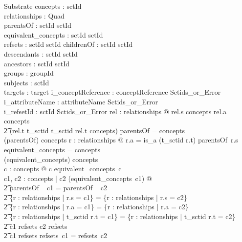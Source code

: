 \documentclass{article}
\begin{document}
\begin{schema}{Substrate}
   concepts : \power sctId \\
   relationships : \power Quad  \\
   parentsOf : sctId \pfun \power sctId \\
   equivalent\_concepts : sctId \pfun \power sctId \\
   refsets : sctId \pfun \power sctId 
\also
   childrenOf : sctId \pfun \power sctId \\
   descendants : sctId \pfun \power sctId \\
   ancestors : sctId \pfun \power sctId \\
\also
   groups : \power groupId \\
   subjects : \power sctId \\
   targets : \power target
\also
   i\_conceptReference : conceptReference \fun Sctids\_or\_Error \\
   i\_attributeName : attributeName \fun Sctids\_or\_Error \\
   i\_refsetId : sctId \fun Sctids\_or\_Error
\where
   \forall rel : relationships @  rel.s \in concepts \land rel.a \in concepts \land \\
\t2 (rel.t \in \ran t\_sctid \implies t\_sctid \inv rel.t \in concepts)
\also
   \dom parentsOf = concepts \\
   \bigcup (\ran parentsOf) \subseteq concepts
\also
   \forall r : relationships @ r.a = is\_a \implies (t\_sctid \inv r.t) \in parentsOf~r.s
\also
   \dom equivalent\_concepts = concepts \\
   \bigcup (\ran equivalent\_concepts) \subseteq concepts \\
  \forall c : concepts @ c \in equivalent\_concepts~c \\
  \forall c1, c2 : concepts | c2 \in (equivalent\_concepts~c1) @ \\
\t2 parentsOf ~ c1 = parentsOf ~ c2 \land \\
\t2 \{r : relationships | r.s = c1\} = \{r : relationships | r.s = c2\} \land \\
\t2 \{r : relationships | r.a = c1\} = \{r : relationships | r.a = c2\} \land \\
\t2 \{r : relationships | t\_sctid \inv r.t = c1\} = \{r : relationships | t\_sctid \inv r.t = c2\} \land \\
\t2 c1 \in \dom refsets \iff c2 \in \dom refsets \land \\
\t2 c1 \in \dom refsets \implies refsets~c1 = refsets~c2 \land \\

\end{schema}
\end{document}
